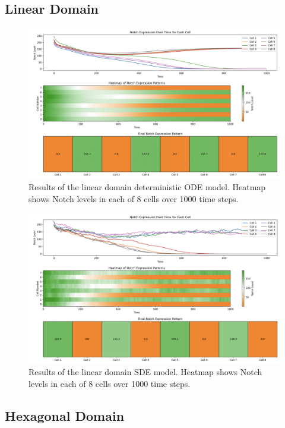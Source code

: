 \documentclass{article}
\begin{document}
\begin{flushleft}
\subsection{Linear Domain}

\begin{figure}
  \includegraphics[width=\textwidth]{img/ODEModel_TwoCell_Heatmap.png}
  \caption{Results of the linear domain deterministic ODE model. Heatmap shows Notch levels in each of 8 cells over 1000 time steps.}
\end{figure}

\begin{figure}
  \includegraphics[width=\textwidth]{img/SDE_CellLine_HeatMap.png}
  \caption{Results of the linear domain SDE model. Heatmap shows Notch levels in each of 8 cells over 1000 time steps.}
\end{figure}

\subsection{Hexagonal Domain}


\end{flushleft}
\end{document}
